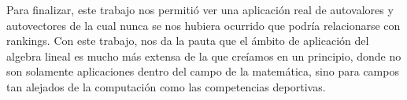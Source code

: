 

Para finalizar, este trabajo nos permitió ver una aplicación real de autovalores y autovectores de la cual nunca se nos hubiera ocurrido que podría relacionarse con rankings. Con este trabajo, nos da la pauta que el ámbito de aplicación del algebra lineal es mucho más extensa de la que creíamos en un principio, donde no son solamente aplicaciones dentro del campo de la matemática, sino para campos tan alejados de la computación como las competencias deportivas.


